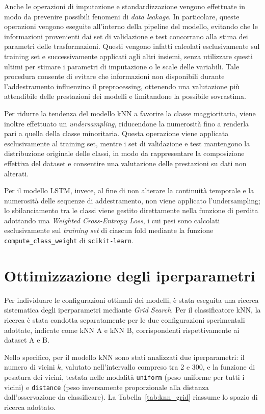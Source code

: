 \documentclass[a4paper,12pt]{report}
\begin{document}
Anche le operazioni di imputazione e standardizzazione vengono effettuate in modo da prevenire possibili fenomeni di \textit{data leakage}. In particolare, queste operazioni vengono eseguite all'interno della pipeline del modello, evitando che le informazioni provenienti dai set di validazione e test concorrano alla stima dei parametri delle trasformazioni. Questi vengono infatti calcolati esclusivamente sul training set e successivamente applicati agli altri insiemi, senza utilizzare questi ultimi per stimare i parametri di imputazione o le scale delle variabili. Tale procedura consente di evitare che informazioni non disponibili durante l'addestramento influenzino il preprocessing, ottenendo una valutazione più attendibile delle prestazioni dei modelli e limitandone la possibile sovrastima.

Per ridurre la tendenza del modello kNN a favorire la classe maggioritaria, viene inoltre effettuato un \textit{undersampling}, riducendone la numerosità fino a renderla pari a quella della classe minoritaria. Questa operazione viene applicata esclusivamente al training set, mentre i set di validazione e test mantengono la distribuzione originale delle classi, in modo da rappresentare la composizione effettiva del dataset e consentire una valutazione delle prestazioni su dati non alterati.

Per il modello LSTM, invece, al fine di non alterare la continuità temporale e la numerosità delle sequenze di addestramento, non viene applicato l'undersampling; lo sbilanciamento tra le classi viene gestito direttamente nella funzione di perdita adottando una \textit{Weighted Cross-Entropy Loss}, i cui pesi sono calcolati esclusivamente sul \textit{training set} di ciascun fold mediante la funzione \texttt{compute\_class\_weight} di \texttt{scikit-learn}.

\section{Ottimizzazione degli iperparametri}

Per individuare le configurazioni ottimali dei modelli, è stata eseguita una ricerca sistematica degli iperparametri mediante \textit{Grid Search}. Per il classificatore kNN, la ricerca è stata condotta separatamente per le due configurazioni sperimentali adottate, indicate come kNN A e kNN B, corrispondenti rispettivamente ai dataset A e B.

Nello specifico, per il modello kNN sono stati analizzati due iperparametri: il numero di vicini \(k\), valutato nell'intervallo compreso tra 2 e 300, e la funzione di pesatura dei vicini, testata nelle modalità \texttt{uniform} (peso uniforme per tutti i vicini) e \texttt{distance} (peso inversamente proporzionale alla distanza dall'osservazione da classificare). La Tabella~\ref{tab:knn_grid} riassume lo spazio di ricerca adottato.
\end{document}
